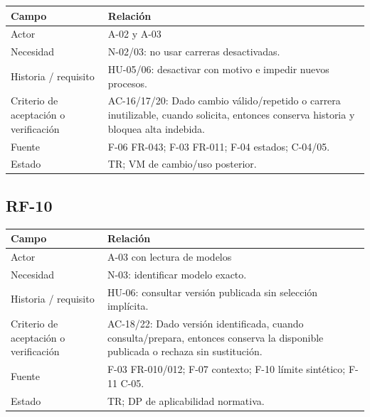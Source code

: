 \documentclass[12pt,a4paper]{report}
\begin{document}
{\def\LTcaptype{none} %
\begin{longtable}[]{@{}
  >{\raggedright\arraybackslash}p{}
  >{\raggedright\arraybackslash}p{}@{}}
\toprule\noalign{}
\begin{minipage}[b]{\linewidth}\raggedright
Campo
\end{minipage} & \begin{minipage}[b]{\linewidth}\raggedright
Relación
\end{minipage} \\
\midrule\noalign{}
\endhead
\bottomrule\noalign{}
\endlastfoot
Actor & A-02 y A-03 \\
Necesidad & N-02/03: no usar carreras desactivadas. \\
Historia / requisito & HU-05/06: desactivar con motivo e impedir
nuevos procesos. \\
Criterio de aceptación o verificación & AC-16/17/20: Dado cambio
válido/repetido o carrera inutilizable, cuando solicita, entonces
conserva historia y bloquea alta indebida. \\
Fuente & F-06 FR-043; F-03 FR-011; F-04 estados; C-04/05. \\
Estado & TR; VM de cambio/uso posterior. \\
\end{longtable}
}

\subsection{RF-10}\label{matriz-RF-10}

{\def\LTcaptype{none} %
\begin{longtable}[]{@{}
  >{\raggedright\arraybackslash}p{}
  >{\raggedright\arraybackslash}p{}@{}}
\toprule\noalign{}
\begin{minipage}[b]{\linewidth}\raggedright
Campo
\end{minipage} & \begin{minipage}[b]{\linewidth}\raggedright
Relación
\end{minipage} \\
\midrule\noalign{}
\endhead
\bottomrule\noalign{}
\endlastfoot
Actor & A-03 con lectura de modelos \\
Necesidad & N-03: identificar modelo exacto. \\
Historia / requisito & HU-06: consultar versión publicada sin
selección implícita. \\
Criterio de aceptación o verificación & AC-18/22: Dado versión
identificada, cuando consulta/prepara, entonces conserva la disponible
publicada o rechaza sin sustitución. \\
Fuente & F-03 FR-010/012; F-07 contexto; F-10 límite sintético; F-11
C-05. \\
Estado & TR; DP de aplicabilidad normativa. \\
\end{longtable}
}
\end{document}
